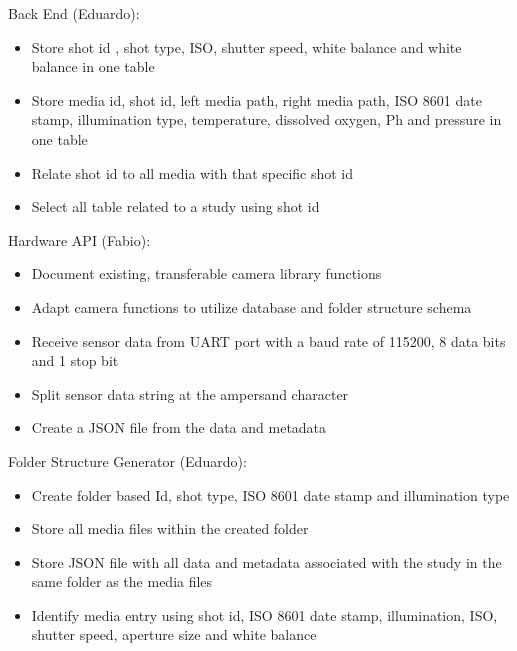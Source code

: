 Back End (Eduardo):
\begin{itemize}
	\item Store shot id , shot type, ISO, shutter speed, white balance and white balance in one table
	\item Store media id, shot id, left media path, right media path, ISO 8601 date stamp, illumination type, temperature, dissolved oxygen, Ph and pressure in one table
	\item Relate shot id to all media with that specific shot id
	\item Select all table related to a study using shot id
\end{itemize}
Hardware API (Fabio):
\begin{itemize}
	\item Document existing, transferable camera library functions
	\item Adapt camera functions to utilize database and folder structure schema
	\item Receive sensor data from UART port with a baud rate of 115200, 8 data bits and 1 stop bit
	\item Split sensor data string at the ampersand character
	\item Create a JSON file from the data and metadata
\end{itemize}
Folder Structure Generator (Eduardo):
\begin{itemize}
	\item Create folder based Id, shot type, ISO 8601 date stamp and illumination type
	\item Store all media files within the created folder
	\item Store JSON file with all data and metadata associated with the study in the same folder as the media files
	\item Identify media entry using shot id, ISO 8601 date stamp, illumination, ISO, shutter speed, aperture size and white balance
\end{itemize}